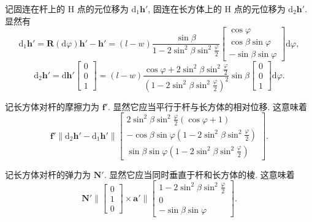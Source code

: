 \documentclass{article}
\newcounter{para}
\begin{document}
记固连在杆上的 H 点的元位移为 $\mathrm d_1\mathbf h'$,
固连在长方体上的 H 点的元位移为 $\mathrm d_2\mathbf h'$.
显然有
\begin{equation}
	\label{eq:d1h'}
	\mathrm d_1\mathbf h'=\mathbf R\!\left(\mathrm d\varphi\right)\mathbf h'-\mathbf h'
	=\left(l-w\right)\frac{\sin\beta}{1-2\sin^2\beta\sin^2\frac\varphi2}
	\left[\begin{matrix}\cos\varphi\\\cos\beta\sin\varphi\\-\sin\beta\sin\varphi\end{matrix}\right]
	\mathrm d\varphi,
\end{equation}
\begin{equation}
	\mathrm d_2\mathbf h'=\mathrm d\mathbf h'\left[\begin{matrix}0\\0\\1\end{matrix}\right]
	=\left(l-w\right)\frac{\cos\varphi+2\sin^2\beta\sin^2\frac\varphi2}
	{\left(1-2\sin^2\beta\sin^2\frac\varphi2\right)^2}\sin\beta
	\left[\begin{matrix}0\\0\\1\end{matrix}\right]\mathrm d\varphi.
\end{equation}

记长方体对杆的摩擦力为 $\mathbf f'$.
显然它应当平行于杆与长方体的相对位移.
这意味着
\begin{equation}
	\mathbf f'\parallel\mathrm d_2\mathbf h'-\mathrm d_1\mathbf h'\parallel
	\left[\begin{matrix}
		2\sin^2\beta\sin^2\frac\varphi2\left(\cos\varphi+1\right)\\
		-\cos\beta\sin\varphi\left(1-2\sin^2\beta\sin^2\frac\varphi2\right)\\
		\sin\beta\sin\varphi\left(1-2\sin^2\beta\sin^2\frac\varphi2\right)
	\end{matrix}\right].
\end{equation}

记长方体对杆的弹力为 $\mathbf N'$.
显然它应当同时垂直于杆和长方体的棱.
这意味着
\begin{equation}
	\mathbf N'\parallel\left[\begin{matrix}0\\1\\0\end{matrix}\right]\times\mathbf a'
	\parallel\left[\begin{matrix}
	1-2\sin^2\beta\sin^2\frac\varphi2\\0\\-\sin\beta\sin\varphi\end{matrix}\right].
\end{equation}
\end{document}
